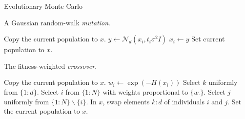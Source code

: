 \documentclass{beamer}\usepackage[]{graphicx}\usepackage[]{color}
\begin{document}
\begin{frame}
\begin{algorithm}[H]
\caption{Evolutionary Monte Carlo}
  \label{alg:emc}
  \footnotesize
  \begin{algorithmic}
     
    \State {}
    \Ow 
    \State {}
    \EndWp
    \State  {}
    \EndProcedure
  \end{algorithmic}
\end{algorithm}
\end{frame}

 \begin{frame}
 \begin{algorithm}[H]
   \caption{A Gaussian random-walk {\it mutation}.}
   \label{alg:mutate}
   \footnotesize
   \begin{algorithmic}
     \State Copy the current population to $x$.
     \State $y \gets \mathcal N_d(x_i,t_i \sigma^2I)$
     \State $x_i \gets y$
     \EndWp
     \EndFor
     \State Set current population to $x$.
     \EndProcedure
   \end{algorithmic}
 \end{algorithm}
 \end{frame}

\begin{frame}
 \begin{algorithm}[H]
   \caption{The fitness-weighted {\it crossover}.}
   \label{alg:crossover}
   \footnotesize
   \begin{algorithmic}
     \State Copy the current population to $x$.
     \State $w_i \gets \exp(-H(x_i))$
     \EndFor
     \State Select $k$ uniformly from $\{1\colon d\}.$
     \State Select $i$ from $\{1\colon N\}$ with weights proportional
     to $\{w_\cdot\}$.
     \State Select $j$ uniformly from $\{1\colon N\} \backslash \{i\}.$ 
    \State In $x$, swap elements $k\colon d$ of individuals $i$ and $j$.
     \Wp {$\cdots$} 
     \State  Set the  current population to $x$.
     \EndWp
     \EndProcedure
   \end{algorithmic}
 \end{algorithm}
 \end{frame}
\end{document}
